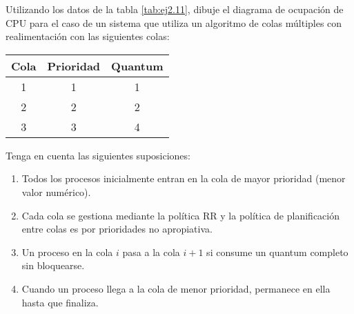 \begin{ejercicio}\label{ej2.12}
    Utilizando los datos de la tabla \ref{tab:ej2.11}, dibuje el diagrama de ocupación de CPU para el caso de un sistema que utiliza un algoritmo de colas múltiples con realimentación con las siguientes colas:
    \begin{table}[H]
        \centering
        \begin{tabular}{c|c|c}
            Cola & Prioridad & Quantum \\ \hline \hline
            1 & 1 & 1 \\
            2 & 2 & 2 \\
            3 & 3 & 4 \\
        \end{tabular}
    \end{table}

    Tenga en cuenta las siguientes suposiciones:
    \begin{enumerate}
        \item Todos los procesos inicialmente entran en la cola de mayor prioridad (menor valor numérico).
        \item Cada cola se gestiona mediante la política RR y la política de planificación entre colas es por prioridades no apropiativa.
        \item Un proceso en la cola $i$ pasa a la cola $i+1$ si consume un quantum completo sin bloquearse.
        \item Cuando un proceso llega a la cola de menor prioridad, permanece en ella hasta que finaliza.
    \end{enumerate}


\end{ejercicio}

